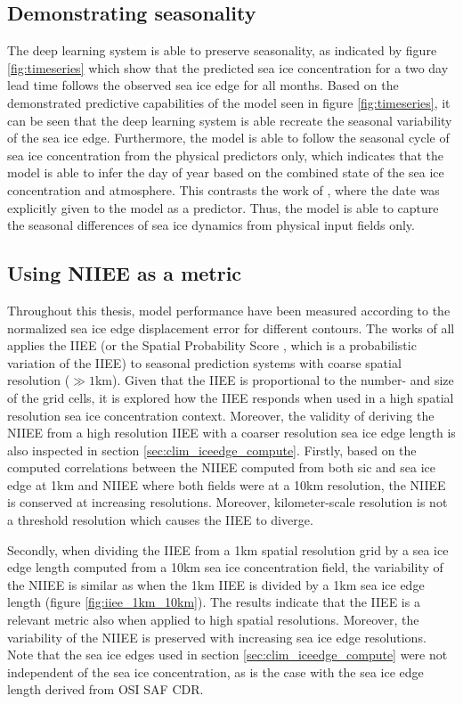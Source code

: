 \documentclass[../main/thesis]{subfiles}
\begin{document}
\subsection{Demonstrating seasonality}
\label{sec:demonstrate_seasonality}
The deep learning system is able to preserve seasonality, as indicated by figure \ref{fig:timeseries} which show that the predicted sea ice concentration for a two day lead time follows the observed sea ice edge for all months. Based on the demonstrated predictive capabilities of the model seen in figure \ref{fig:timeseries}, it can be seen that the deep learning system is able recreate the seasonal variability of the sea ice edge. Furthermore, the model is able to follow the seasonal cycle of sea ice concentration from the physical predictors only, which indicates that the model is able to infer the day of year based on the combined state of the sea ice concentration and atmosphere. This contrasts the work of \citet{Grigoryev2022}, where the date was explicitly given to the model as a predictor. Thus, the model is able to capture the seasonal differences of sea ice dynamics from physical input fields only.

\subsection{Using NIIEE as a metric}
Throughout this thesis, model performance have been measured according to the normalized sea ice edge displacement error \citep{Goessling2016, Melsom2019, Palerme2019, Zampieri2019} for different contours. The works of \citet{Goessling2016, Palerme2019, Zampieri2019} all applies the IIEE (or the Spatial Probability Score \citep{Goessling2018}, which is a probabilistic variation of the IIEE) to seasonal prediction systems with coarse spatial resolution ($\gg1$km). Given that the IIEE is proportional to the number- and size of the grid cells, it is explored how the IIEE responds when used in a high spatial resolution sea ice concentration context. Moreover, the validity of deriving the NIIEE from a high resolution IIEE with a coarser resolution sea ice edge length is also inspected in section \ref{sec:clim_iceedge_compute}. Firstly, based on the computed correlations between the NIIEE computed from both sic and sea ice edge at 1km and NIIEE where both fields were at a 10km resolution, the NIIEE is conserved at increasing resolutions. Moreover, kilometer-scale resolution is not a threshold resolution which causes the IIEE to diverge.

Secondly, when dividing the IIEE from a 1km spatial resolution grid by a sea ice edge length computed from a 10km sea ice concentration field, the variability of the NIIEE is similar as when the 1km IIEE is divided by a 1km sea ice edge length (figure \ref{fig:iiee_1km_10km}). The results indicate that the IIEE is a relevant metric also when applied to high spatial resolutions. Moreover, the variability of the NIIEE is preserved with increasing sea ice edge resolutions. Note that the sea ice edges used in section \ref{sec:clim_iceedge_compute} were not independent of the sea ice concentration, as is the case with the sea ice edge length derived from OSI SAF CDR.
\end{document}

